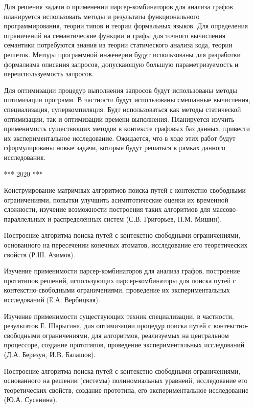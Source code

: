 \documentclass[12pt]{article}  %
\theoremstyle{remark}
\begin{document}
Для решения задачи о применении парсер-комбинаторов для анализа графов планируется использовать методы и результаты функционального программирования, теории типов и теории формальных языков.
Для определения ограничений на семантические функции и графы для точного вычисления семантики потребуются знания из теории статического анализа кода, теории решеток.
Методы программной инженерии будут использованы для разработки формализма описания запросов, допускающую большую параметризуемость и переиспользуемость запросов.

Для оптимизации процедур выполнения запросов будут использованы методы оптимизации программ. В частности будут использованы смешанные вычисления, специализация, суперкомпиляция. Будт использоваться как методы статической оптимизации, так и оптимизации времени выполнения. Планируется изучить применимость существющих методов в контексте графовых баз данных, привести их экспериментальное исследование. Ожидается, что в ходе этих работ будут сформулированы новые задачи, которые будут решаться в рамках данного исследования.

*** 2020 ***

Конструирование матричных алгоритмов поиска путей с контекстно-свободными ограничениями, попытки улучшить асимптотические оценки их временной сложности, изучение возможности построения таких алгоритмов для массово-параллельных и распределённых систем (С.В. Григорьев, Н.М. Мишин).

Построение алгоритма поиска путей с контекстно-свободными ограничениями, основанного на пересечении конечных атоматов, исследование его теоретических свойств (Р.Ш. Азимов).

Изучение применимости парсер-комбинаторов для анализа графов, построение протитипов решений, использующих парсер-комбинаторы для поиска путей с контекстно-свободными ограничениями, проведение их экспериментальных исследований (Е.А. Вербицкая).

Изучение применимости существующих техник специализации, в частности, результатов Е. Шарыгина, для оптимизации процедур поиска путей с контекстно-свободными ограничениями, для алгоритмов, реализуемых на центральном процессоре, создание прототипов, проведение экспериментальных исследований (Д.А. Березун, И.B. Балашов).

Построение алгоритма поиска путей с контекстно-свободными ограничениями, основанного на решении (системы) полиномиальных уравнеий, исследование его теоретических свойств, создание прототипа, его экспериментальное исследование (Ю.А. Сусанина).
\end{document}
